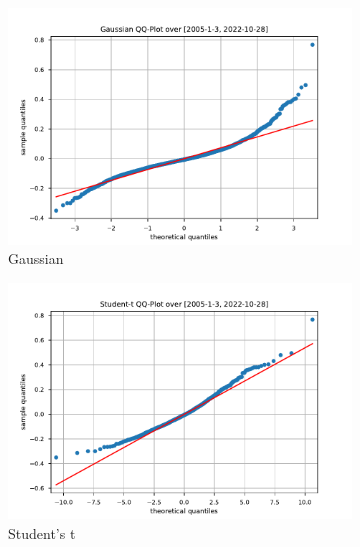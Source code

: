 \begin{figure}[htbp]
    \centering
    \begin{subfigure}[b]{0.32\textwidth}
        \centering
        \includegraphics[width=\textwidth]{content/reschap4/Figures/gauss_QQ_2005-1-3-2022-10-28.pdf}
        \caption{Gaussian}
    \end{subfigure}
    \hfill
    \begin{subfigure}[b]{0.32\textwidth}
        \centering
        \includegraphics[width=\textwidth]{content/reschap4/Figures/student_QQ_2005-1-3-2022-10-28.pdf}
        \caption{Student's t}
    \end{subfigure}
    \hfill
    \begin{subfigure}[b]{0.32\textwidth}
        \centering

\end{subfigure}
\end{figure}
